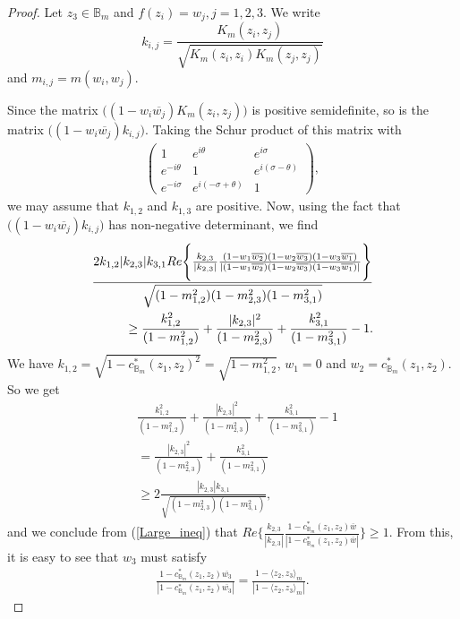 \documentclass[12pt]{amsart}
\theoremstyle{definition}
\numberwithin{equation}{section}
\begin{document}
\begin{proof}
	Let $z_3\in \mathbb{B}_m$ and $f(z_i)=w_j,j=1,2,3$. We write $$k_{i,j}=\frac{K_m (z_i,z_j)}{\sqrt{K_m (z_i,z_i)K_m (z_j,z_j)}}$$
	and $m_{i,j}=m(w_i,w_j)$.
	
	Since the matrix $\big((1-w_i\overline{w_j})K_m (z_i,z_j)\big)$ is positive semidefinite, so is the matrix $\big((1-w_i\overline{w_j})k_{i,j}\big)$. Taking the Schur product of this matrix with
	\begin{align*}
		\begin{pmatrix}
			1&e^{i\theta}&e^{i\sigma}\\
			e^{-i\theta}&1&e^{i(\sigma-\theta)}\\
			e^{-i\sigma}&e^{i(-\sigma+\theta)}&1
		\end{pmatrix},
	\end{align*} 
	we may assume that $k_{1,2}$ and $k_{1,3}$ are positive. Now, using the fact that $\big((1-w_i\overline{w_j})k_{i,j}\big)$ has non-negative determinant, we find
	\begin{align}\label{Large_ineq}
		\frac{2k_{1,2} |k_{2,3}|k_{3,1}Re\Biggl\{\frac{k_{2,3}}{|k_{2,3}|}\frac{(1-w_1 \overline{w_2})(1-w_2 \overline{w_3})(1-w_3\overline{w_1})}{|(1-w_1 \overline{w_2})(1-w_2 \overline{w_3})(1-w_3\overline{w_1})|}\Biggr\} }{\sqrt{(1-m_{1,2}^2)(1-m_{2,3}^2)(1-m_{3,1}^2)}}\\
		\geq\frac{k_{1,2}^2}{(1-m_{1,2}^2)}+\frac{|k_{2,3}|^2}{(1-m_{2,3}^2)}+\frac{k_{3,1}^2}{(1-m_{3,1}^2)}-1.\notag
	\end{align}
	We have $k_{1,2}=\sqrt{1-c^* _{\mathbb{B}_m}(z_1,z_2)^2}=\sqrt{1-m_{1,2} ^2}$, $w_1=0$ and $w_2=c^* _{\mathbb{B}_m} (z_1,z_2)$. So we get
	\begin{align*}
		&\frac{k_{1,2}^2}{(1-m_{1,2}^2)}+\frac{|k_{2,3}|^2}{(1-m_{2,3}^2)}+\frac{k_{3,1}^2}{(1-m_{3,1}^2)}-1\\
		&=\frac{|k_{2,3}|^2}{(1-m_{2,3}^2)}+\frac{k_{3,1}^2}{(1-m_{3,1}^2)}\\
		&\geq 2\frac{|k_{2,3}|k_{3,1}}{\sqrt{(1-m_{2,3}^2)(1-m_{3,1}^2)}},
	\end{align*}
	 and we conclude from (\ref{Large_ineq}) that $Re\Big\{\frac{k_{2,3}}{|k_{2,3}|}\frac{1-c^* _{\mathbb{B}_m} (z_1,z_2) \overline{w}}{|1-c^* _{\mathbb{B}_m} (z_1,z_2) \overline{w}|}\Big\}\geq 1$. From this, it is easy to see that $w_3$ must satisfy \begin{align*}
	\frac{1-c^* _{\mathbb{B}_m} (z_1,z_2) \overline{w_3}}{|1-c^* _{\mathbb{B}_m} (z_1,z_2) \overline{w_3}|}=\frac{1-\langle z_2,z_3\rangle_m}{|1-\langle z_2,z_3\rangle_m|}.
	\end{align*}
\end{proof}
\end{document}
